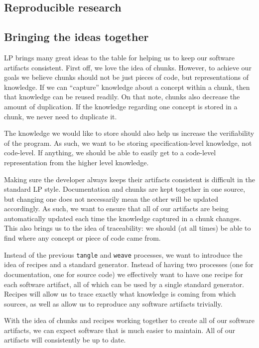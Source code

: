 \documentclass[preprint, 10pt]{sigplanconf}
\begin{document}
\subsection{Reproducible research} %
\label{subsec:rr}

\subsection{Bringing the ideas together}
\label{subsec:ideas}

LP brings many great ideas to the table for helping us to keep our software
artifacts consistent. First off, we love the idea of chunks. However, to achieve
our goals we believe chunks should not be just pieces of code, but
representations of knowledge. If we can ``capture'' knowledge about a concept
within a chunk, then that knowledge can be reused readily. On that note, chunks
also decrease the amount of duplication. If the knowledge regarding one
concept is stored in a chunk, we never need to duplicate it.

The knowledge we would like to store should also help us increase the
verifiability of the program. As such, we want to be storing specification-level
knowledge, not code-level. If anything, we should be able to easily get to a
code-level representation from the higher level knowledge.

Making sure the developer always keeps their artifacts consistent is difficult
in the standard LP style. Documentation and chunks are kept together in one
source, but changing one does not necessarily mean the other will be updated
accordingly. As such, we want to ensure that all of our artifacts are being
automatically updated each time the knowledge captured in a chunk changes. This
also brings us to the idea of traceability: we should (at all times) be able to
find where any concept or piece of code came from.

Instead of the previous \verb|tangle| and \verb|weave| processes, we want to
introduce the idea of recipes and a standard generator. Instead of having two
processes (one for documentation, one for source code) we effectively want to
have one recipe for each software artifact, all of which can be used by a single
standard generator. Recipes will allow us to trace exactly what knowledge is
coming from which sources, as well as allow us to reproduce any software
artifacts trivially.

With the idea of chunks and recipes working together to create all of our
software artifacts, we can expect software that is much easier to maintain. All
of our artifacts will consistently be up to date.
\end{document}
